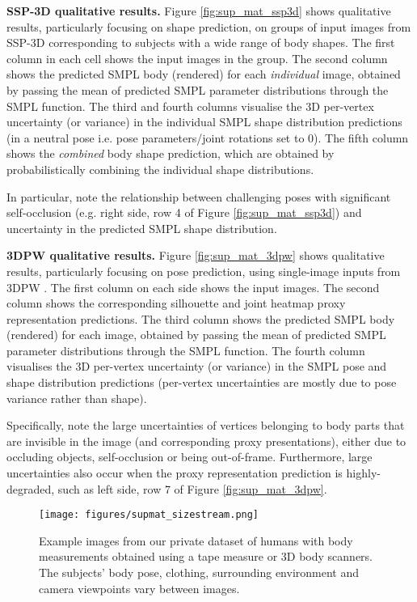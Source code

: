 \documentclass[final]{cvpr}
\begin{document}
\noindent \textbf{SSP-3D qualitative results.}
Figure \ref{fig:sup_mat_ssp3d} shows qualitative results, particularly focusing on shape prediction, on groups of input images from SSP-3D \cite{STRAPS2020BMVC} corresponding to subjects with a wide range of body shapes. The first column in each cell shows the input images in the group. The second column shows the predicted SMPL \cite{SMPL:2015} body (rendered) for each \textit{individual} image, obtained by passing the mean of predicted SMPL parameter distributions through the SMPL function. The third and fourth columns visualise the 3D per-vertex uncertainty (or variance) in the individual SMPL shape distribution predictions (in a neutral pose i.e. pose parameters/joint rotations set to 0). The fifth column shows the \textit{combined} body shape prediction, which are obtained by probabilistically combining the individual shape distributions. 

In particular, note the relationship between challenging poses with significant self-occlusion (e.g. right side, row 4 of Figure \ref{fig:sup_mat_ssp3d}) and uncertainty in the predicted SMPL shape distribution.

\noindent \textbf{3DPW qualitative results.}
Figure \ref{fig:sup_mat_3dpw} shows qualitative results, particularly focusing on pose prediction, using single-image inputs from 3DPW \cite{vonMarcard2018}. The first column on each side shows the input images. The second column shows the corresponding silhouette and joint heatmap proxy representation predictions. The third column shows the predicted SMPL \cite{SMPL:2015} body (rendered) for each image, obtained by passing the mean of predicted SMPL parameter distributions through the SMPL function. The fourth column visualises the 3D per-vertex uncertainty (or variance) in the SMPL pose and shape distribution predictions (per-vertex uncertainties are mostly due to pose variance rather than shape). 

Specifically, note the large uncertainties of vertices belonging to body parts that are invisible in the image (and corresponding proxy presentations), either due to occluding objects, self-occlusion or being out-of-frame. Furthermore, large uncertainties also occur when the proxy representation prediction is highly-degraded, such as left side, row 7 of Figure \ref{fig:sup_mat_3dpw}.

\begin{figure}
    \centering
    \texttt{[image: figures/supmat\_sizestream.png]}
    \caption{Example images from our private dataset of humans with body measurements obtained using a tape measure or 3D body scanners. The subjects' body pose, clothing, surrounding environment and camera viewpoints vary between images.}
    \label{fig:supmat_sizestream}
\end{figure}
\end{document}
